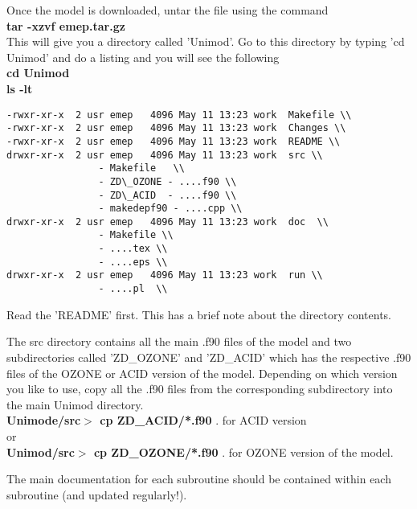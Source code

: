 Once the model is downloaded, untar the file using  the command \\

\textbf{tar -xzvf emep.tar.gz} \\

This will give you a directory called 'Unimod'.  Go to this directory
by typing 'cd Unimod' and do a listing and you will see the following
\\

\textbf{cd Unimod} \\
 \textbf{ls -lt}


\begin{verbatim}
-rwxr-xr-x  2 usr emep   4096 May 11 13:23 work  Makefile \\
-rwxr-xr-x  2 usr emep   4096 May 11 13:23 work  Changes \\
-rwxr-xr-x  2 usr emep   4096 May 11 13:23 work  README \\
drwxr-xr-x  2 usr emep   4096 May 11 13:23 work  src \\
                - Makefile   \\
                - ZD\_OZONE - ....f90 \\
                - ZD\_ACID  - ....f90 \\
                - makedepf90 - ....cpp \\
drwxr-xr-x  2 usr emep   4096 May 11 13:23 work  doc  \\
                - Makefile \\
                - ....tex \\
                - ....eps \\
drwxr-xr-x  2 usr emep   4096 May 11 13:23 work  run \\
                - ....pl  \\

\end{verbatim}

Read the 'README' first.  This has a brief note about the directory
contents.  

The src directory contains all the main .f90 files of the model and two
subdirectories called 'ZD\_OZONE' and 'ZD\_ACID' which has the
respective .f90 files of the OZONE or ACID version of the model.
Depending on which version you like to use, copy all the .f90 files
from the corresponding subdirectory into the main Unimod directory. \\

\textbf{Unimode/src$>$ cp ZD\_ACID/*.f90} .  for ACID version \\

or \\

\textbf{Unimod/src$>$ cp ZD\_OZONE/*.f90} .  for OZONE version of the model. 


The main documentation for each subroutine should be contained within
each subroutine (and updated regularly!).



